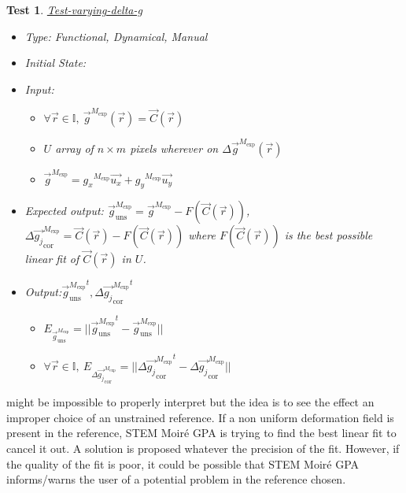 \documentclass[12pt, titlepage]{article}
\newcommand{\progname}{STEM Moir{\'e} GPA}
\newtheorem{Test}{Test}
\begin{document}
\begin{Test}\normalfont\underline{Test-varying-delta-g}
\label{T_varying-delta-g}
\begin{itemize}
\item Type: Functional, Dynamical, Manual
\item Initial State: 
\item Input: 
	\begin{itemize}
	\item $\forall \vec{r} \in \mathbb{I}, \ \overrightarrow{g}^{M_{\text{exp}}}(\vec{r})=\overrightarrow{C}(\vec{r})$
	\item $U$ array of $n \times m$ pixels wherever on $\Delta \overrightarrow{g}^{M_{\text{exp}}}(\vec{r})$
	\item $\overrightarrow{g}^{M_{\text{exp}}}={g_x}^{M_{\text{exp}}}\overrightarrow{u_x}+{g_y}^{M_{\text{exp}}}\overrightarrow{u_y}$
\end{itemize}
\item Expected output: $\overrightarrow{g}_{\text{uns}}^{M_{\text{exp}}}=\overrightarrow{g}^{M_{\text{exp}}}-F(\overrightarrow{C}(\vec{r}))$,   $\Delta\overrightarrow{g_{j}}_{\text{cor}}^{M_{\text{exp}}}=\overrightarrow{C}(\vec{r})-F(\overrightarrow{C}(\vec{r}))$ where $F(\overrightarrow{C}(\vec{r}))$ is the best possible linear fit of $\overrightarrow{C}(\vec{r})$ in $U$.
\item Output:${\overrightarrow{g}_{\text{uns}}^{M_{\text{exp}}}}^{t}, {\Delta\overrightarrow{g_{j}}_{\text{cor}}^{M_{\text{exp}}}}^{t}$
	\begin{itemize}
	\item $E_{\overrightarrow{g}_{\text{uns}}^{M_{\text{exp}}}}=||{\overrightarrow{g}_{\text{uns}}^{M_{\text{exp}}}}^{t}-\overrightarrow{g}_{\text{uns}}^{M_{\text{exp}}}||$
	\item $\forall \vec{r} \in \mathbb{I}, \ E_{\Delta\overrightarrow{g_{j}}_{\text{cor}}^{M_{\text{exp}}}}=||{\Delta\overrightarrow{g_{j}}_{\text{cor}}^{M_{\text{exp}}}}^{t}-\Delta\overrightarrow{g_{j}}_{\text{cor}}^{M_{\text{exp}}}||$
	\end{itemize}
\end{itemize}
\end{Test}

 might be impossible to properly interpret but the idea is to see the effect an improper choice of an unstrained reference. If a non uniform deformation field is present in the reference, \progname{} is trying to find the best linear fit to cancel it out. A solution is proposed whatever the precision of the fit. However, if the quality of the fit is poor, it could be possible that \progname{} informs/warns the user of a potential problem in the reference chosen.
\end{document}
